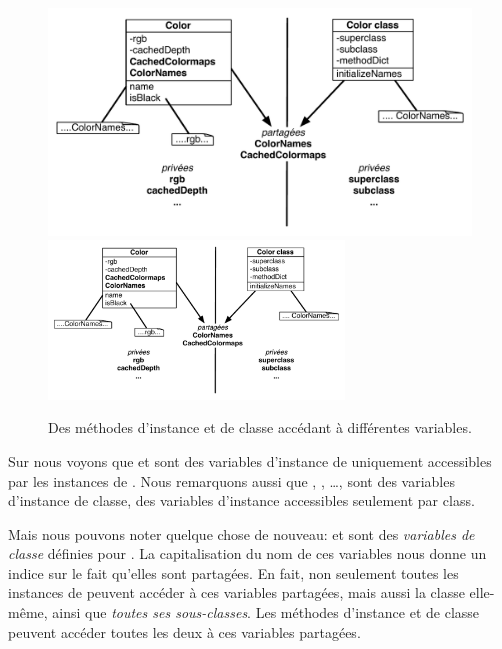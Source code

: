 \documentclass[a4paper,10pt,twoside]{book}
\begin{document}
\begin{figure}[htb]
\begin{center}
\ifluluelse
	{\includegraphics[width=\textwidth]{privateSharedVarColor}}
	{\includegraphics[width=0.7\textwidth]{privateSharedVarColor}}
\caption{Des méthodes d'instance et de classe accédant à différentes
variables.}
\end{center}
\end{figure}

Sur  nous voyons que  et  sont
des variables d'instance de  uniquement accessibles par les 
instances de .
Nous remarquons aussi que , , \ldots \etc, sont des variables d'instance de classe, \ie des variables d'instance  accessibles seulement par  class.

Mais nous pouvons noter quelque chose de nouveau:  et  sont des \emph{variables de classe} définies pour .
La capitalisation du nom de ces variables nous donne un indice sur le fait qu'elles sont partagées.
En fait, non seulement toutes les instances de  peuvent accéder
à ces variables partagées, mais aussi la classe  elle-même, ainsi que \emph{toutes ses sous-classes}.
Les méthodes d'instance et de classe peuvent accéder toutes les deux
à ces variables partagées.
\end{document}
